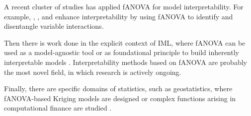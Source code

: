 A recent cluster of studies has applied fANOVA for model interpretability. 
For example, \citet{lengerich2020}, \citet{konig2024}, and \citet{choi2025} 
enhance interpretability by using fANOVA to identify and disentangle variable interactions.

Then there is work done in the explicit context of IML, where fANOVA can be used as a model-agnostic tool \citep{hooker2004,fumagalli2025} or as foundational principle to build inherently interpretable models \citep{hu2025}. Interpretability methods based on fANOVA are probably the most novel field, in which research is actively ongoing.

Finally, there are specific domains of statistics, such as geostatistics, where fANOVA-based Kriging models are designed \citep{muehlenstaedt2012} or
complex functions arising in computational finance are studied \citep{liu2006}.







